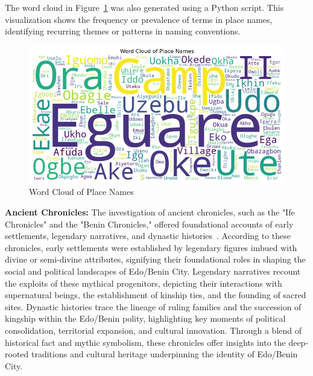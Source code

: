 The word cloud in Figure~\ref{fig:wordcloud} was also generated using a Python script. This visualization shows the frequency or prevalence of terms in place names, identifying recurring themes or patterns in naming conventions.
\begin{figure}[htb]
    \centering
    \includegraphics[width=.8\linewidth]{wordcloud.png}
    \caption{Word Cloud of Place Names}
    \label{fig:wordcloud}
\end{figure}

\textbf{Ancient Chronicles:} The investigation of ancient chronicles, such as the "Ife Chronicles" and the "Benin Chronicles," offered foundational accounts of early settlements, legendary narratives, and dynastic histories~\cite{otterbein1966}. According to these chronicles, early settlements were established by legendary figures imbued with divine or semi-divine attributes, signifying their foundational roles in shaping the social and political landscapes of Edo/Benin City. Legendary narratives recount the exploits of these mythical progenitors, depicting their interactions with supernatural beings, the establishment of kinship ties, and the founding of sacred sites. Dynastic histories trace the lineage of ruling families and the succession of kingship within the Edo/Benin polity, highlighting key moments of political consolidation, territorial expansion, and cultural innovation. Through a blend of historical fact and mythic symbolism, these chronicles offer insights into the deep-rooted traditions and cultural heritage underpinning the identity of Edo/Benin City.